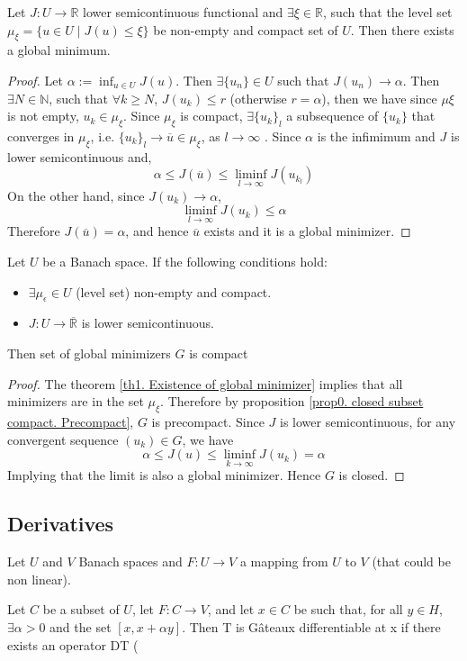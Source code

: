 \begin{theorem}
	Let $J: U\rightarrow \mathbb{R}$ lower semicontinuous functional and $\exists \xi \in \mathbb{R}$, such that the level set $\mu_\xi=\{ u \in U \mid J(u)\leq \xi\}$ be non-empty and compact set of $U$. Then there exists a global minimum.
	\begin{proof}
		Let $\alpha := \inf_{u\in U} J(u)$. Then $\exists \{u_n\} \in U $ such that $J(u_n) \rightarrow \alpha$. Then  $\exists N\in \mathbb{N}$, such that $\forall k \geq N$,  $J(u_k) \leq r$ (otherwise $r=\alpha$), then we have since $\mu \xi$ is not empty, $u_k \in \mu_\xi$. Since $\mu_\xi$ is compact,  $\exists \{u_k\}_l$ a subsequence of $\{u_k\}$ that converges in $\mu_\xi$, i.e. $\{u_k\}_l \rightarrow \overline{u} \in \mu_\xi$, as $l \rightarrow \infty$	. Since $\alpha$ is the infimimum and $J$ is lower semicontinuous and,
		 \[\alpha \leq J(\overline{u}) \leq \liminf_{l\rightarrow \infty} J(u_{k_l}) \]
		 On the other hand,  since $J(u_k) \rightarrow \alpha$,
		 \[
		  \liminf_{l\rightarrow \infty} J(u_k) \leq \alpha
		 \]
		 Therefore $J(\overline{u})=\alpha$, and hence $\overline{u}$ exists and it is a global minimizer.
	\end{proof}
	\label{th1. Existence of global minimizer}
\end{theorem}
\begin{corollary}
	Let $U$ be a Banach space. If the following conditions hold:
	\begin{itemize}
		\item $\exists \mu_\epsilon \in U$ (level set) non-empty and compact.
		\item $J: U \rightarrow \overline{\mathbb{R}}$ is lower semicontinuous. 
	\end{itemize}
	Then set of global minimizers  $G$ is compact
	\begin{proof}
		The theorem \ref{th1. Existence of global minimizer} implies that all minimizers are in the set $\mu_\xi$. Therefore by proposition \ref{prop0. closed subset compact. Precompact}, $G$ is precompact. Since $J$ is lower semicontinuous, for any convergent sequence $(u_k) \in G$, we have
		\[
			\alpha \leq J(u) \leq \liminf_{k\rightarrow\infty} J(u_k)=\alpha
		\]
		Implying that the limit is also a global minimizer. Hence $G$ is closed.
	\end{proof}
\end{corollary}
\subsection{Derivatives}
Let $U$ and $V$ Banach spaces and $F:U\rightarrow V$ a mapping from $U$ to $V$ (that could be non linear).
\begin{definition}
	Let $C$ be a subset of $U$, let $F: C \rightarrow V$, and let $x \in C$
	be such that, for all $y \in H$, $\exists \alpha >0$ and the set $[x, x + \alpha y]$. Then T is Gâteaux
	differentiable at x if there exists an operator DT (
\end{definition}
 
